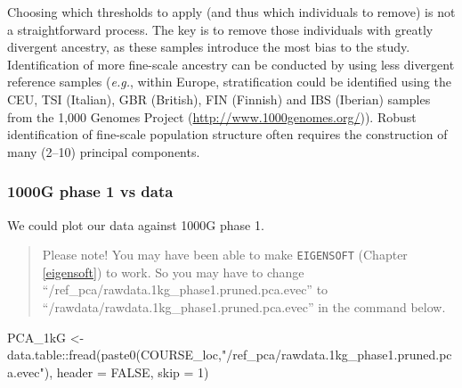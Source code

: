 \documentclass[
]{book}
\newenvironment{Shaded}{\begin{snugshade}}{\end{snugshade}}
\newcommand{\AttributeTok}[1]{\textcolor[rgb]{0.77,0.63,0.00}{#1}}
\newcommand{\ConstantTok}[1]{\textcolor[rgb]{0.00,0.00,0.00}{#1}}
\newcommand{\DecValTok}[1]{\textcolor[rgb]{0.00,0.00,0.81}{#1}}
\newcommand{\FunctionTok}[1]{\textcolor[rgb]{0.00,0.00,0.00}{#1}}
\newcommand{\NormalTok}[1]{#1}
\newcommand{\OtherTok}[1]{\textcolor[rgb]{0.56,0.35,0.01}{#1}}
\newcommand{\SpecialCharTok}[1]{\textcolor[rgb]{0.00,0.00,0.00}{#1}}
\newcommand{\StringTok}[1]{\textcolor[rgb]{0.31,0.60,0.02}{#1}}
\begin{document}
Choosing which thresholds to apply (and thus which individuals to remove) is not a straightforward process. The key is to remove those individuals with greatly divergent ancestry, as these samples introduce the most bias to the study. Identification of more fine-scale ancestry can be conducted by using less divergent reference samples (\emph{e.g.}, within Europe, stratification could be identified using the CEU, TSI (Italian), GBR (British), FIN (Finnish) and IBS (Iberian) samples from the 1,000 Genomes Project (\url{http://www.1000genomes.org/})). Robust identification of fine-scale population structure often requires the construction of many (2--10) principal components.

\hypertarget{g-phase-1-vs-data-1}{%
\subsubsection{1000G phase 1 vs data}\label{g-phase-1-vs-data-1}}

We could plot our data against 1000G phase 1.

\begin{quote}
Please note! You may have been able to make \texttt{EIGENSOFT} (Chapter \ref{eigensoft}) to work. So you may have to change ``/ref\_pca/rawdata.1kg\_phase1.pruned.pca.evec'' to ``/rawdata/rawdata.1kg\_phase1.pruned.pca.evec'' in the command below.
\end{quote}

\begin{Shaded}
\begin{Highlighting}[]
\NormalTok{PCA\_1kG }\OtherTok{\textless{}{-}}\NormalTok{ data.table}\SpecialCharTok{::}\FunctionTok{fread}\NormalTok{(}\FunctionTok{paste0}\NormalTok{(COURSE\_loc,}\StringTok{"/ref\_pca/rawdata.1kg\_phase1.pruned.pca.evec"}\NormalTok{), }\AttributeTok{header =} \ConstantTok{FALSE}\NormalTok{, }\AttributeTok{skip =} \DecValTok{1}\NormalTok{)}
\end{Highlighting}
\end{Shaded}
\end{document}
